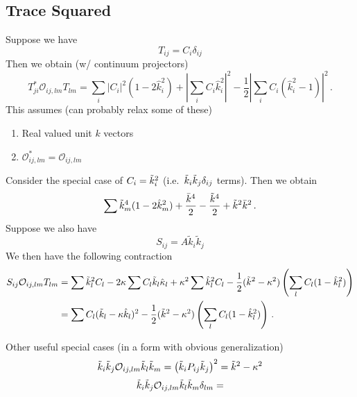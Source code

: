 \documentclass{revtex4}
\begin{document}
\subsection{Trace Squared}
Suppose we have
\begin{equation}
  T_{ij} = C_i\delta_{ij}
\end{equation}
Then we obtain (w/ continuum projectors)
\begin{equation}
  T_{ji}^*\mathcal{O}_{ij,lm}T_{lm} = \sum_i |C_i|^2(1-2\hat{k}_i^2) + \left|\sum_i C_i\hat{k}_i^2\right|^2 - \frac{1}{2}\left|\sum_i C_i(\hat{k}_i^2-1)\right|^2 \, .
\end{equation}
This assumes (can probably relax some of these)
\begin{enumerate}
\item Real valued unit $k$ vectors
\item $\mathcal{O}_{ij,lm}^* = \mathcal{O}_{ij,lm}$
\end{enumerate}
Consider the special case of $C_i = \tilde{k}_i^2$ (i.e.\ $\tilde{k}_i\tilde{k}_j\delta_{ij}$ terms).
Then we obtain
\begin{equation}
  \sum \tilde{k}_m^4(1-2\hat{k}_m^2) + \frac{\bar{k}^4}{2} - \frac{\tilde{k}^4}{2} + \tilde{k}^2\bar{k}^2 \, .
\end{equation}
Suppose we also have
\begin{equation}
  S_{ij} = A\tilde{k}_i\tilde{k}_j
\end{equation}
We then have the following contraction
\begin{align}
  S_{ij}\mathcal{O}_{ij,lm}T_{lm} &= \sum \tilde{k}_l^2C_l - 2\kappa\sum C_l\tilde{k}_l\hat{\kappa}_l + \kappa^2\sum\hat{k}_l^2C_l - \frac{1}{2}(\tilde{k}^2-\kappa^2)\left(\sum_l C_l(1-\hat{k}_l^2)\right) \\
  &= \sum C_l(\tilde{k}_l-\kappa\hat{k}_l)^2 - \frac{1}{2}(\tilde{k}^2-\kappa^2)\left(\sum_l C_l(1-\hat{k}_l^2)\right) \, .
\end{align}

Other useful special cases (in a form with obvious generalization)
\begin{equation}
  \tilde{k}_i\tilde{k}_j\mathcal{O}_{ij,lm}\tilde{k}_l\tilde{k}_m = \left(\tilde{k}_iP_{ij}\tilde{k}_j\right)^2 = \tilde{k}^2-\kappa^2
\end{equation}
\begin{equation}
  \tilde{k}_i\tilde{k}_j\mathcal{O}_{ij,lm}\tilde{k}_l\tilde{k}_m\delta_{lm} = 
\end{equation}
\end{document}
